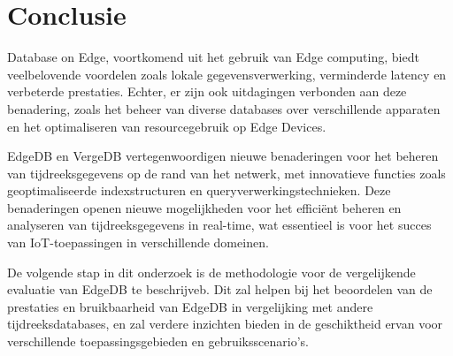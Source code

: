 \section{Conclusie}
Database on Edge, voortkomend uit het gebruik van Edge computing, biedt veelbelovende voordelen zoals lokale gegevensverwerking, verminderde latency en verbeterde prestaties. Echter, er zijn ook uitdagingen verbonden aan deze benadering, zoals het beheer van diverse databases over verschillende apparaten en het optimaliseren van resourcegebruik op Edge Devices.

EdgeDB en VergeDB vertegenwoordigen nieuwe benaderingen voor het beheren van tijdreeksgegevens op de rand van het netwerk, met innovatieve functies zoals geoptimaliseerde indexstructuren en queryverwerkingstechnieken. Deze benaderingen openen nieuwe mogelijkheden voor het efficiënt beheren en analyseren van tijdreeksgegevens in real-time, wat essentieel is voor het succes van IoT-toepassingen in verschillende domeinen.

De volgende stap in dit onderzoek is de methodologie voor de vergelijkende evaluatie van EdgeDB te beschrijveb. Dit zal helpen bij het beoordelen van de prestaties en bruikbaarheid van EdgeDB in vergelijking met andere tijdreeksdatabases, en zal verdere inzichten bieden in de geschiktheid ervan voor verschillende toepassingsgebieden en gebruiksscenario's.

